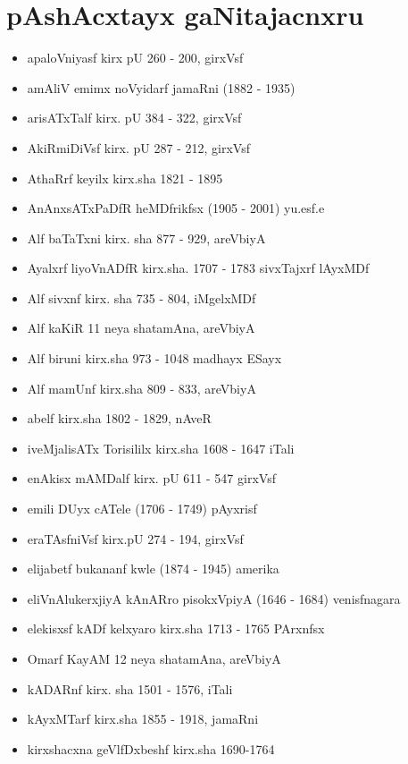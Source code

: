 \section*{pAshAcxtayx gaNitajacnxru}

{\renewcommand\labelitemi{}
\begin{itemize}
\item apaloVniyasf kirx pU {\rm 260 - 200}, girxVsf
\item amAliV emimx noVyidarf jamaRni {\rm (1882 - 1935)}
\item arisATxTalf kirx. pU {\rm 384 - 322}, girxVsf
\item AkiRmiDiVsf kirx. pU {\rm 287 - 212}, girxVsf
\item AthaRrf keyilx kirx.sha {\rm 1821 - 1895}
\item AnAnxsATxPaDfR heMDfrikfsx {\rm (1905 - 2001)} yu.esf.e
\item Alf baTaTxni kirx. sha {\rm 877 - 929}, areVbiyA
\item Ayalxrf liyoVnADfR kirx.sha. {\rm 1707 - 1783} sivxTajxrf lAyxMDf
\item Alf sivxnf kirx. sha {\rm 735 - 804}, iMgelxMDf
\item Alf kaKiR {\rm 11} neya shatamAna, areVbiyA
\item Alf biruni kirx.sha {\rm 973 - 1048} madhayx ESayx
\item Alf mamUnf kirx.sha {\rm 809 - 833}, areVbiyA
\item abelf kirx.sha {\rm 1802 - 1829}, nAveR
\item iveMjalisATx Torisililx kirx.sha {\rm 1608 - 1647} iTali
\item enAkisx mAMDalf kirx. pU {\rm 611 - 547} girxVsf
\item emili DUyx cATele {\rm (1706 - 1749)} pAyxrisf
\item eraTAsfniVsf kirx.pU {\rm 274 - 194}, girxVsf
\item elijabetf bukananf kwle {\rm (1874 - 1945)} amerika
\item eliVnAlukerxjiyA kAnARro pisokxVpiyA {\rm (1646 - 1684)} venisfnagara
\item elekisxsf kADf kelxyaro kirx.sha {\rm 1713 - 1765} PArxnfsx
\item Omarf KayAM {\rm 12} neya shatamAna, areVbiyA
\item kADARnf kirx. sha {\rm 1501 - 1576}, iTali
\item kAyxMTarf kirx.sha {\rm 1855 - 1918}, jamaRni
\item kirxshacxna geVlfDxbeshf kirx.sha {\rm 1690-1764}

\end{itemize}}
